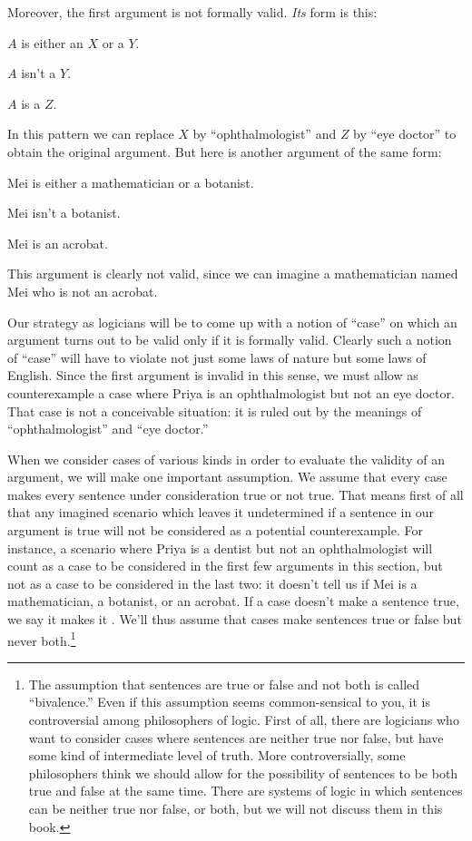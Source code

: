 Moreover, the first argument is not formally valid. \emph{Its} form is this:
\begin{earg}
	\item[] $A$ is either an $X$ or a $Y$.
	\item[] $A$ isn't a $Y$.
	\item[\texttherefore] $A$ is a $Z$.
\end{earg}
In this pattern we can replace $X$ by ``ophthalmologist'' and $Z$ by ``eye doctor'' to obtain the original argument.  But here is another argument of the same form:
\begin{earg}
	\item[] Mei is either a mathematician or a botanist.
	\item[] Mei isn't a botanist.
	\item[\texttherefore] Mei is an acrobat.
\end{earg}
This argument is clearly not valid, since we can imagine a mathematician named Mei who is not an acrobat.

Our strategy as logicians will be to come up with a notion of ``case''
on which an argument turns out to be valid only if it is formally
valid. Clearly such a notion of ``case'' will have to violate not just
some laws of nature but some laws of English. Since the first argument
is invalid in this sense, we must allow as counterexample a case where
Priya is an ophthalmologist but not an eye doctor.  That case is not a
conceivable situation: it is ruled out by the meanings of
``ophthalmologist'' and ``eye doctor.''

When we consider cases of various kinds in order to evaluate the
validity of an argument, we will make one important assumption. We
assume that every case makes every sentence under consideration true
or not true. That means first of all that any imagined scenario which
leaves it undetermined if a sentence in our argument is true will not
be considered as a potential counterexample. For instance, a scenario
where Priya is a dentist but not an ophthalmologist will count as a
case to be considered in the first few arguments in this section, but
not as a case to be considered in the last two: it doesn't tell us if
Mei is a mathematician, a botanist, or an acrobat. If a case doesn't
make a sentence true, we say it makes it . We'll thus
assume that cases make sentences true or false but never
both.\footnote{The assumption that sentences are true or false and not
both is called ``bivalence.'' Even if this assumption seems
common-sensical to you, it is controversial among philosophers of
logic. First of all, there are logicians who want to consider cases
where sentences are neither true nor false, but have some kind of
intermediate level of truth. More controversially, some philosophers
think we should allow for the possibility of sentences to be both true
and false at the same time. There are systems of logic in which
sentences can be neither true nor false, or both, but we will not
discuss them in this book.}

